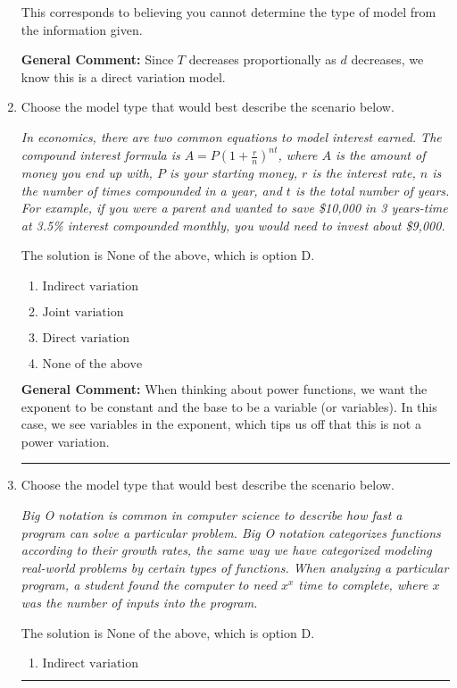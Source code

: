 \documentclass{extbook}[14pt]
\newcommand{\litem}[1]{\item #1

\rule{\textwidth}{0.4pt}}
\begin{document}
\begin{enumerate}
{\begin{enumerate}[label=\Alph*.]
This corresponds to believing you cannot determine the type of model from the information given.
\end{enumerate}

\textbf{General Comment:} Since $T$ decreases proportionally as $d$ decreases, we know this is a direct variation model.
}
\litem{
Choose the model type that would best describe the scenario below.

\begin{center}
    \textit{ In economics, there are two common equations to model interest earned. The compound interest formula is $A = P (1 + \frac{r}{n})^{nt}$, where $A$ is the amount of money you end up with, $P$ is your starting money, $r$ is the interest rate, $n$ is the number of times compounded in a year, and $t$ is the total number of years. For example, if you were a parent and wanted to save \$10,000 in 3 years-time at 3.5\% interest compounded monthly, you would need to invest about \$9,000. }
\end{center}
The solution is \( \text{None of the above} \), which is option D.\begin{enumerate}[label=\Alph*.]
\item \( \text{Indirect variation} \)


\item \( \text{Joint variation} \)


\item \( \text{Direct variation} \)


\item \( \text{None of the above} \)


\end{enumerate}

\textbf{General Comment:} When thinking about power functions, we want the exponent to be constant and the base to be a variable (or variables). In this case, we see variables in the exponent, which tips us off that this is not a power variation.
}
\litem{
Choose the model type that would best describe the scenario below.

\begin{center}
    \textit{ Big O notation is common in computer science to describe how fast a program can solve a particular problem. Big O notation categorizes functions according to their growth rates, the same way we have categorized modeling real-world problems by certain types of functions. When analyzing a particular program, a student found the computer to need $x^x$ time to complete, where $x$ was the number of inputs into the program. }
\end{center}
The solution is \( \text{None of the above} \), which is option D.\begin{enumerate}[label=\Alph*.]
\item \( \text{Indirect variation} \)



\end{enumerate}}
\end{enumerate}
\end{document}
